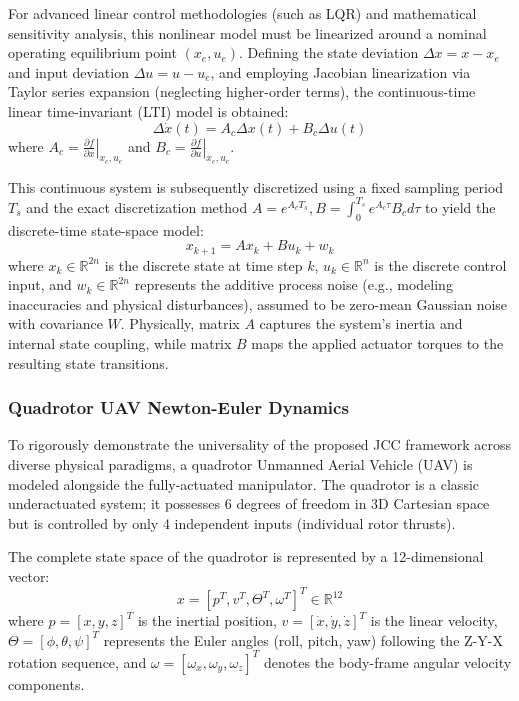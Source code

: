 For advanced linear control methodologies (such as LQR) and mathematical sensitivity analysis, this nonlinear model must be linearized around a nominal operating equilibrium point $(x_e, u_e)$. Defining the state deviation $\Delta x = x - x_e$ and input deviation $\Delta u = u - u_e$, and employing Jacobian linearization via Taylor series expansion (neglecting higher-order terms), the continuous-time linear time-invariant (LTI) model is obtained:
\begin{equation}
    \Delta \dot{x}(t) = A_c \Delta x(t) + B_c \Delta u(t)
\end{equation}
where $A_c = \left. \frac{\partial f}{\partial x} \right|_{x_e, u_e}$ and $B_c = \left. \frac{\partial f}{\partial u} \right|_{x_e, u_e}$.

This continuous system is subsequently discretized using a fixed sampling period $T_s$ and the exact discretization method $A = e^{A_c T_s}, B = \int_0^{T_s} e^{A_c \tau} B_c d\tau$ to yield the discrete-time state-space model:
\begin{equation} \label{eq:discrete_state_space}
    x_{k+1} = A x_k + B u_k + w_k
\end{equation}
where $x_k \in \mathbb{R}^{2n}$ is the discrete state at time step $k$, $u_k \in \mathbb{R}^n$ is the discrete control input, and $w_k \in \mathbb{R}^{2n}$ represents the additive process noise (e.g., modeling inaccuracies and physical disturbances), assumed to be zero-mean Gaussian noise with covariance $W$. Physically, matrix $A$ captures the system's inertia and internal state coupling, while matrix $B$ maps the applied actuator torques to the resulting state transitions.

\subsubsection{Quadrotor UAV Newton-Euler Dynamics}
To rigorously demonstrate the universality of the proposed JCC framework across diverse physical paradigms, a quadrotor Unmanned Aerial Vehicle (UAV) is modeled alongside the fully-actuated manipulator. The quadrotor is a classic underactuated system; it possesses 6 degrees of freedom in 3D Cartesian space but is controlled by only 4 independent inputs (individual rotor thrusts).

The complete state space of the quadrotor is represented by a 12-dimensional vector:
\begin{equation}
    x = [p^T, v^T, \Theta^T, \omega^T]^T \in \mathbb{R}^{12}
\end{equation}
where $p=[x,y,z]^T$ is the inertial position, $v=[\dot{x}, \dot{y}, \dot{z}]^T$ is the linear velocity, $\Theta = [\phi, \theta, \psi]^T$ represents the Euler angles (roll, pitch, yaw) following the Z-Y-X rotation sequence, and $\omega = [\omega_x, \omega_y, \omega_z]^T$ denotes the body-frame angular velocity components.

